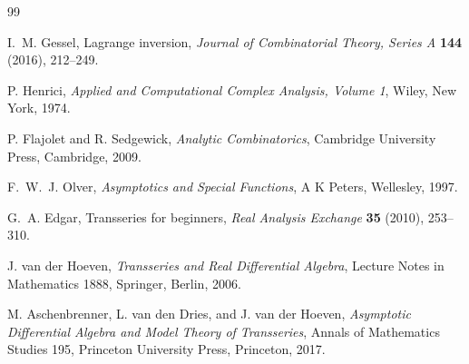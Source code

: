 \documentclass[11pt,oneside]{article}
\numberwithin{equation}{section}
\begin{document}
\begin{thebibliography}{99}

I.~M. Gessel,
\newblock Lagrange inversion,
\newblock \emph{Journal of Combinatorial Theory, Series A} \textbf{144}
(2016), 212--249.

P. Henrici,
\newblock \emph{Applied and Computational Complex Analysis, Volume 1},
\newblock Wiley, New York, 1974.

P. Flajolet and R. Sedgewick,
\newblock \emph{Analytic Combinatorics},
\newblock Cambridge University Press, Cambridge, 2009.

F.~W.~J. Olver,
\newblock \emph{Asymptotics and Special Functions},
\newblock A K Peters, Wellesley, 1997.

G.~A. Edgar,
\newblock Transseries for beginners,
\newblock \emph{Real Analysis Exchange} \textbf{35} (2010), 253--310.

J. van der Hoeven,
\newblock \emph{Transseries and Real Differential Algebra},
\newblock Lecture Notes in Mathematics 1888, Springer, Berlin, 2006.

M. Aschenbrenner, L. van den Dries, and J. van der Hoeven,
\newblock \emph{Asymptotic Differential Algebra and Model Theory of
Transseries},
\newblock Annals of Mathematics Studies 195, Princeton University Press,
Princeton, 2017.

\end{thebibliography}
\end{document}

